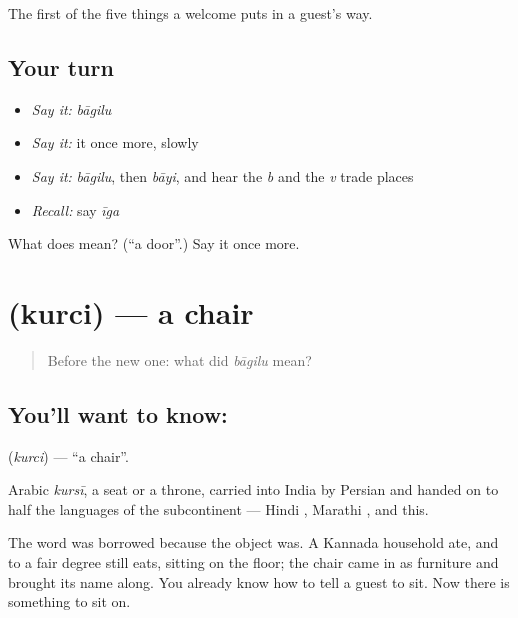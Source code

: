 \begin{grammarlens}[title={What you've built}]
The first of the five things a welcome puts in a guest's way.
\end{grammarlens}

\subsection*{Your turn}
\begin{itemize}
\raggedright
  \item \emph{Say it:} \emph{bāgilu}
  \item \emph{Say it:} it once more, slowly
  \item \emph{Say it:} \emph{bāgilu}, then \emph{bāyi}, and hear the \emph{b} and the \emph{v} trade places
  \item \emph{Recall:} say \emph{īga}
\end{itemize}

\begin{tcolorbox}[breakable,colback=teal!4,colframe=teal!35!black,title={Before you move on}]
What does  mean? (\textquotedblleft{}a door\textquotedblright{}.) Say it once more.
\end{tcolorbox}
\section[\texorpdfstring{\kn{ಕುರ್ಚಿ} (kurci)}{ಕುರ್ಚಿ (kurci)}]{ (kurci) — a chair}

\label{lesson:KA-C52-chair}



\begin{quote}
Before the new one: what did \emph{bāgilu} mean?
\end{quote}

\subsection*{You'll want to know: }
\textbf{} (\emph{kurci}) — \textquotedblleft{}a chair\textquotedblright{}.

Arabic \emph{kursī}, a seat or a throne, carried into India by Persian and handed on to half the languages of the subcontinent — Hindi , Marathi , and this.

The word was borrowed because the object was. A Kannada household ate, and to a fair degree still eats, sitting on the floor; the chair came in as furniture and brought its name along. You already know how to tell a guest to sit. Now there is something to sit on.

